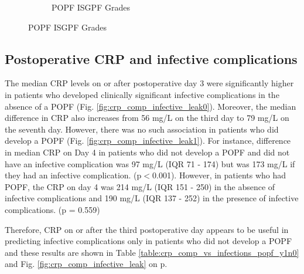\begin{figure}[t]
\begin{subfigure}{0.48\textwidth}
		\caption{POPF ISGPF Grades}
		\label{fig:crp_comp_crp_popf_isgps}
	\end{subfigure}
\end{figure}
\hfill

\clearpage

\subsection{Postoperative CRP and infective complications}
The median CRP levels on or after postoperative day 3 were significantly higher in patients who developed clinically significant infective complications in the absence of a POPF (Fig. \ref{fig:crp_comp_infective_leak0}). Moreover, the median difference in CRP also increases from 56 mg/L on the third day to 79 mg/L on the seventh day. However, there was no such association in patients who did develop a POPF (Fig. \ref{fig:crp_comp_infective_leak1}).  For instance, difference in median CRP on Day 4 in patients who did not develop a POPF and did not have an infective complication was 97 mg/L (IQR 71 - 174) but was 173 mg/L if they had an infective complication. (p$<$0.001). However, in patients who had POPF, the CRP on day 4 was 214 mg/L (IQR 151 - 250) in the absence of infective complications and 190 mg/L (IQR 137 - 252) in the presence of infective complications. (p = 0.559)

Therefore, CRP on or after the third postoperative day appears to be useful in predicting infective complications only in patients who did not develop a POPF and these results are shown in Table \ref{table:crp_comp_vs_infections_popf_y1n0} and Fig. \ref{fig:crp_comp_infective_leak} on p\pageref{fig:crp_comp_infective_leak}. 

